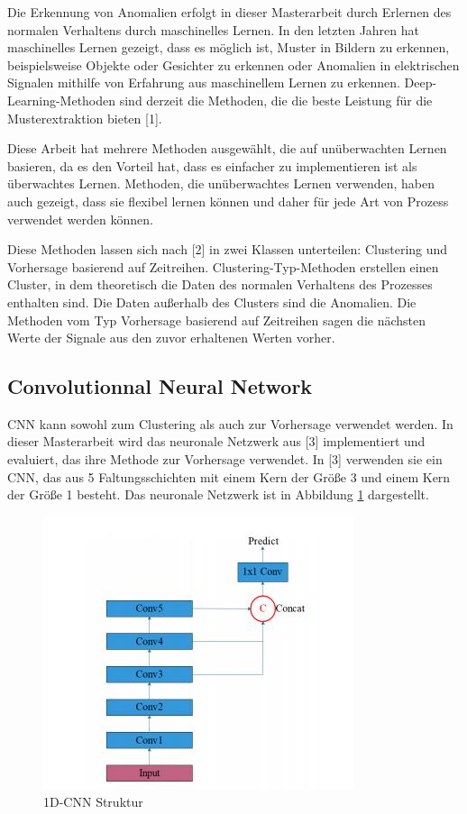 \documentclass[12pt,a4paper]{scrartcl}
\numberwithin{equation}{section}
\begin{document}
Die Erkennung von Anomalien erfolgt in dieser Masterarbeit durch Erlernen des normalen Verhaltens durch maschinelles Lernen. In den letzten Jahren hat maschinelles Lernen gezeigt, dass es möglich ist, Muster in Bildern zu erkennen, beispielsweise Objekte oder Gesichter zu erkennen oder Anomalien in elektrischen Signalen mithilfe von Erfahrung aus maschinellem Lernen zu erkennen. Deep-Learning-Methoden sind derzeit die Methoden, die die beste Leistung für die Musterextraktion bieten [1]. 

Diese Arbeit hat mehrere Methoden ausgewählt, die auf unüberwachten Lernen basieren, da es den Vorteil hat, dass es einfacher zu implementieren ist als überwachtes Lernen. Methoden, die unüberwachtes Lernen verwenden, haben auch gezeigt, dass sie flexibel lernen können und daher für jede Art von Prozess verwendet werden können.

Diese Methoden lassen sich nach [2] in zwei Klassen unterteilen: Clustering und Vorhersage basierend auf Zeitreihen. Clustering-Typ-Methoden erstellen einen Cluster, in dem theoretisch die Daten des normalen Verhaltens des Prozesses enthalten sind. Die Daten außerhalb des Clusters sind die Anomalien. Die Methoden vom Typ Vorhersage basierend auf Zeitreihen sagen die nächsten Werte der Signale aus den zuvor erhaltenen Werten vorher. 

\subsection{Convolutionnal Neural Network}

CNN kann sowohl zum Clustering als auch zur Vorhersage verwendet werden. In dieser Masterarbeit wird das neuronale Netzwerk aus [3] implementiert und evaluiert, das ihre Methode zur Vorhersage verwendet. In [3] verwenden sie ein CNN, das aus 5 Faltungsschichten mit einem Kern der Größe 3 und einem Kern der Größe 1 besteht. Das neuronale Netzwerk ist in Abbildung \ref{1DCNN_struktur} dargestellt.

\begin{figure}[h]
	\centering
	  \includegraphics[scale=1]{1DCNN.jpg}
	  \caption{1D-CNN Struktur}
	 \label{1DCNN_struktur}
\end{figure}
\end{document}
